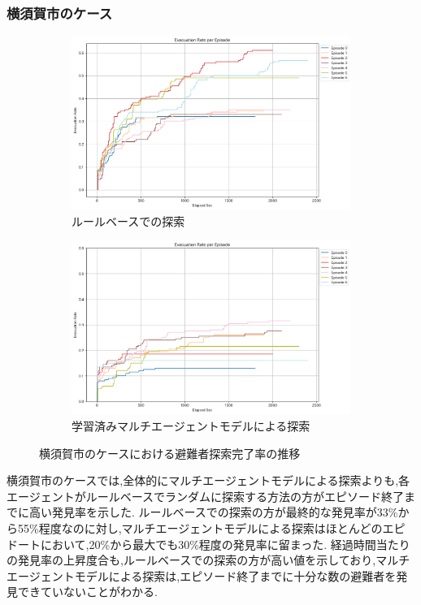 \subsubsection{横須賀市のケース}
\begin{figure}[H]
  \centering
  \begin{subfigure}{0.51\textwidth}
      \centering
      \includegraphics[width=\textwidth]{Figures/YokosukaSearch-RuleResult.png}
      \caption{ルールベースでの探索}
      \label{fig:YokosukaSearch-RuleResult}
  \end{subfigure}
  \begin{subfigure}{0.48\textwidth}
      \centering
      \includegraphics[width=\textwidth]{Figures/YokosukaSearch-AgentsResult.png}
      \caption{学習済みマルチエージェントモデルによる探索}
      \label{fig:YokosukaSearch-AgentResult}
  \end{subfigure}
  \caption{横須賀市のケースにおける避難者探索完了率の推移}
  \label{fig:YokosukaSearch-Result}
\end{figure}
横須賀市のケースでは,全体的にマルチエージェントモデルによる探索よりも,各エージェントがルールベースでランダムに探索する方法の方がエピソード終了までに高い発見率を示した.
ルールベースでの探索の方が最終的な発見率が33\%から55\%程度なのに対し,マルチエージェントモデルによる探索はほとんどのエピドートにおいて,20\%から最大でも30\%程度の発見率に留まった.
経過時間当たりの発見率の上昇度合も,ルールベースでの探索の方が高い値を示しており,マルチエージェントモデルによる探索は,エピソード終了までに十分な数の避難者を発見できていないことがわかる.

